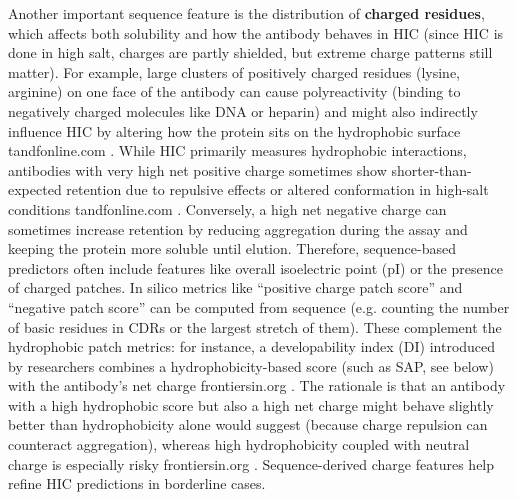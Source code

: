 \documentclass[12pt]{article}
\begin{document}
Another important sequence feature is the distribution of \textbf{charged residues}, which affects both solubility and how the antibody behaves in HIC (since HIC is done in high salt, charges are partly shielded, but extreme charge patterns still matter). For example, large clusters of positively charged residues (lysine, arginine) on one face of the antibody can cause polyreactivity (binding to negatively charged molecules like DNA or heparin) and might also indirectly influence HIC by altering how the protein sits on the hydrophobic surface
tandfonline.com
. While HIC primarily measures hydrophobic interactions, antibodies with very high net positive charge sometimes show shorter-than-expected retention due to repulsive effects or altered conformation in high-salt conditions
tandfonline.com
. Conversely, a high net negative charge can sometimes increase retention by reducing aggregation during the assay and keeping the protein more soluble until elution. Therefore, sequence-based predictors often include features like overall isoelectric point (pI) or the presence of charged patches. In silico metrics like “positive charge patch score” and “negative patch score” can be computed from sequence (e.g. counting the number of basic residues in CDRs or the largest stretch of them). These complement the hydrophobic patch metrics: for instance, a developability index (DI) introduced by researchers combines a hydrophobicity-based score (such as SAP, see below) with the antibody’s net charge
frontiersin.org
. The rationale is that an antibody with a high hydrophobic score but also a high net charge might behave slightly better than hydrophobicity alone would suggest (because charge repulsion can counteract aggregation), whereas high hydrophobicity coupled with neutral charge is especially risky
frontiersin.org
. Sequence-derived charge features help refine HIC predictions in borderline cases.
\end{document}
